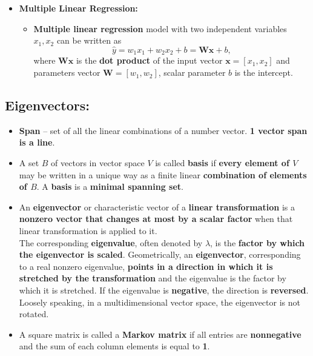 \documentclass[16pt]{article}
\begin{document}
\begin{itemize}
	\item \textbf{Multiple Linear Regression:}
	\begin{itemize}
		\item \textbf{Multiple linear regression} model with two independent variables $x_1, x_2$ can be written as
		\begin{equation*}
			\hat{y} = w_1x_1 + w_2x_2 + b = \mathbf{Wx} + b,
		\end{equation*}
		where $\mathbf{Wx}$ is the \textbf{dot product} of the input vector $\mathbf{x}=[x_1, x_2]$ and parameters vector $\mathbf{W}=[w_1, w_2]$, scalar parameter $b$ is the intercept.
	\end{itemize}
	\end{itemize}
	\subsection{Eigenvectors:}
	\begin{itemize}
		\item \textbf{Span} -- set of all the linear combinations of a number vector. \textbf{1 vector span is a line}.
		\item A set $B$ of vectors in vector space $V$ is called \textbf{basis} if \textbf{every element of $V$} may be written in a unique way as a finite linear \textbf{combination of elements of $B$}. A \textbf{basis} is a \textbf{minimal spanning set}.
		\item An \textbf{eigenvector} or characteristic vector of a \textbf{linear transformation} is a \textbf{nonzero vector that changes at most by a scalar factor} when that linear transformation is applied to it. 
		\\
		The corresponding \textbf{eigenvalue}, often denoted by $\lambda$, is the \textbf{factor by which the eigenvector is scaled}. Geometrically, an \textbf{eigenvector}, corresponding to a real nonzero eigenvalue, \textbf{points in a direction in which it is stretched by the transformation} and the eigenvalue is the factor by which it is stretched. If the eigenvalue is \textbf{negative}, the direction is \textbf{reversed}. Loosely speaking, in a multidimensional vector space, the eigenvector is not rotated.
		\item A square matrix is called a \textbf{Markov matrix} if all entries are \textbf{nonnegative} and the sum of each column elements is equal to \textbf{1}.
	\end{itemize}
\end{document}
